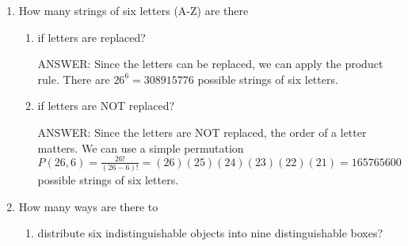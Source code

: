 \documentclass[12pt]{article}
\newcommand\buf{\vspace{0.10in}}
\newenvironment{answer}{\fontfamily{ptm}\selectfont \smaller[1] ANSWER: }{}
\begin{document}
\begin{enumerate}
\begin{enumerate}
    \begin{answer}
        \begin{align*}
            C(4, 3) &= C(3, 2) + C(3, 3) \\
            &= C(2, 1) + C(2, 2) + 1 \\
            &= C(1, 0) + C(1, 1) + 2\\
            &= 4
        \end{align*}
    \end{answer}
    \buf

\end{enumerate}




\item How many strings of six letters (A-Z) are there

\begin{enumerate}

    \item if letters are replaced?
    \buf

    \begin{answer}
        Since the letters can be replaced, we can apply the product rule. There are $26^{6} = 308915776$ possible strings of six letters.
    \end{answer}
    \buf

    \item if letters are NOT replaced?
    \buf

    \begin{answer}
        Since the letters are NOT replaced, the order of a letter matters. We can use a simple permutation $P(26, 6) = \frac{26!}{(26-6)!} = (26)(25)(24)(23)(22)(21) = 165765600$ possible strings of six letters.
    \end{answer}
    \buf

\end{enumerate}


\item How many ways are there to

\begin{enumerate}

    \item distribute six indistinguishable objects into nine distinguishable boxes?
    \buf


\end{enumerate}
\end{enumerate}
\end{document}
